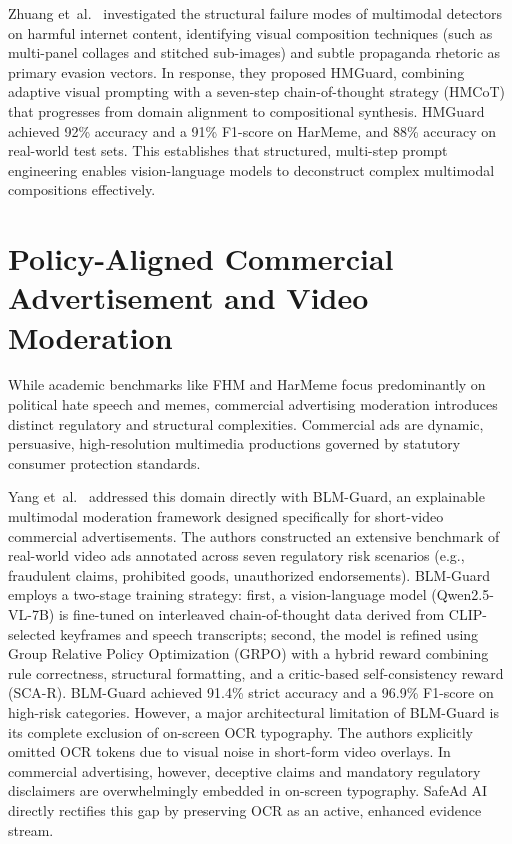 \documentclass[12pt,a4paper]{report}
\begin{document}
Zhuang et~al.~\cite{zhuang2025} investigated the structural failure modes of multimodal detectors on harmful internet content, identifying visual composition techniques (such as multi-panel collages and stitched sub-images) and subtle propaganda rhetoric as primary evasion vectors. In response, they proposed HMGuard, combining adaptive visual prompting with a seven-step chain-of-thought strategy (HMCoT) that progresses from domain alignment to compositional synthesis. HMGuard achieved 92\% accuracy and a 91\% F1-score on HarMeme, and 88\% accuracy on real-world test sets. This establishes that structured, multi-step prompt engineering enables vision-language models to deconstruct complex multimodal compositions effectively.

\section{Policy-Aligned Commercial Advertisement and Video Moderation}

While academic benchmarks like FHM and HarMeme focus predominantly on political hate speech and memes, commercial advertising moderation introduces distinct regulatory and structural complexities. Commercial ads are dynamic, persuasive, high-resolution multimedia productions governed by statutory consumer protection standards.

Yang et~al.~\cite{blmguard2026} addressed this domain directly with BLM-Guard, an explainable multimodal moderation framework designed specifically for short-video commercial advertisements. The authors constructed an extensive benchmark of real-world video ads annotated across seven regulatory risk scenarios (e.g., fraudulent claims, prohibited goods, unauthorized endorsements). BLM-Guard employs a two-stage training strategy: first, a vision-language model (Qwen2.5-VL-7B) is fine-tuned on interleaved chain-of-thought data derived from CLIP-selected keyframes and speech transcripts; second, the model is refined using Group Relative Policy Optimization (GRPO) with a hybrid reward combining rule correctness, structural formatting, and a critic-based self-consistency reward (SCA-R). BLM-Guard achieved 91.4\% strict accuracy and a 96.9\% F1-score on high-risk categories. However, a major architectural limitation of BLM-Guard is its complete exclusion of on-screen OCR typography. The authors explicitly omitted OCR tokens due to visual noise in short-form video overlays. In commercial advertising, however, deceptive claims and mandatory regulatory disclaimers are overwhelmingly embedded in on-screen typography. SafeAd AI directly rectifies this gap by preserving OCR as an active, enhanced evidence stream.
\end{document}
